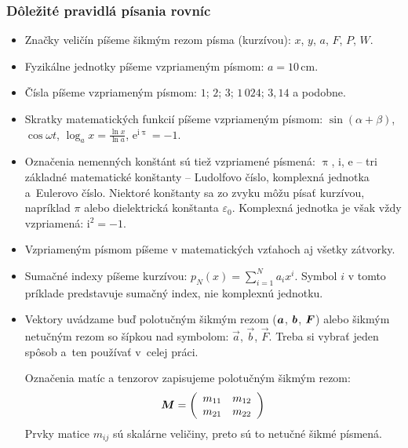 \subsubsection{Dôležité pravidlá písania rovníc}
\begin{itemize}

    \item Značky veličín píšeme šikmým rezom písma (kurzívou):
    $x$, $y$, $a$, $F$, $P$, $W$.

    \item Fyzikálne jednotky píšeme vzpriameným písmom:
    $a = 10\,\mathrm{cm}$.

    \item Čísla píšeme vzpriameným písmom:
    $1$; $2$; $3$; $1\,024$; $3{,}14$ a podobne.

    \item Skratky matematických funkcií píšeme vzpriameným
    písmom: $\sin(\alpha + \beta)$, $\cos\omega t$,
    $\log_a x = \frac{\ln x}{\ln a}$, $\mathrm{e^{i\uppi}}=-1$.

    \item Označenia nemenných konštánt sú tiež vzpriamené
    písmená: $\uppi$, $\mathrm i$, $\mathrm e$ --
    tri základné matematické konštanty --
    Ludolfovo číslo, komplexná jednotka a~Eulerovo číslo.
    Niektoré konštanty sa zo zvyku môžu písať kurzívou,
    napríklad $\pi$ alebo dielektrická konštanta $\varepsilon_0$.
    Komplexná jednotka je však vždy vzpriamená:
    $\mathrm i^2 = -1$.

    \item Vzpriameným písmom píšeme v matematických vzťahoch
    aj všetky zátvorky.

    \item Sumačné indexy píšeme kurzívou:
    $p_N(x) = \sum_{i=1}^N a_ix^i$.
    Symbol $i$ v tomto príklade predstavuje sumačný index,
    nie komplexnú jednotku.

    \item Vektory uvádzame buď polotučným šikmým rezom
    ($\vectorsym a$, $\vectorsym b$, $\vectorsym F$)
    alebo šikmým netučným rezom so šípkou nad symbolom:
    $\vec a$, $\vec b$, $\vec F$.
    Treba si vybrať jeden spôsob a~ten používať v~celej práci.

    Označenia matíc a tenzorov zapisujeme polotučným šikmým rezom:
    $$\matrixsym M = \left( \begin{array}{cc}
                            m_{11} & m_{12}\\
                            m_{21} & m_{22}
                        \end{array}\right)
    $$
    Prvky matice $m_{ij}$ sú skalárne veličiny, preto sú to
    netučné šikmé písmená.


\end{itemize}

